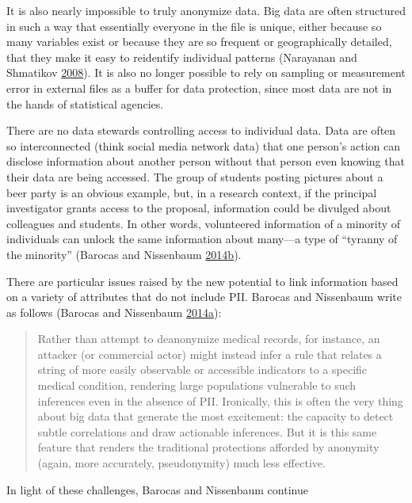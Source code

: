 \documentclass[]{krantz}
\begin{document}
It is also nearly impossible to truly anonymize data. Big data are often
structured in such a way that essentially everyone in the file is
unique, either because so many variables exist or because they are so
frequent or geographically detailed, that they make it easy to
reidentify individual patterns (Narayanan and Shmatikov
\protect\hyperlink{ref-narayanan2008robust}{2008}). It is also no longer
possible to rely on sampling or measurement error in external files as a
buffer for data protection, since most data are not in the hands of
statistical agencies.

There are no data stewards controlling access to individual data. Data
are often so interconnected (think social media network data) that one
person's action can disclose information about another person without
that person even knowing that their data are being accessed. The group
of students posting pictures about a beer party is an obvious example,
but, in a research context, if the principal investigator grants access
to the proposal, information could be divulged about colleagues and
students. In other words, volunteered information of a minority of
individuals can unlock the same information about many---a type of
``tyranny of the minority'' (Barocas and Nissenbaum
\protect\hyperlink{ref-barocas2014bigger}{2014}\protect\hyperlink{ref-barocas2014bigger}{b}).

There are particular issues raised by the new potential to link
information based on a variety of attributes that do not include PII.
Barocas and Nissenbaum write as follows (Barocas and Nissenbaum
\protect\hyperlink{ref-barocas2014big}{2014}\protect\hyperlink{ref-barocas2014big}{a}):

\begin{quote}
Rather than attempt to deanonymize medical records, for instance, an
attacker (or commercial actor) might instead infer a rule that relates a
string of more easily observable or accessible indicators to a specific
medical condition, rendering large populations vulnerable to such
inferences even in the absence of PII. Ironically, this is often the
very thing about big data that generate the most excitement: the
capacity to detect subtle correlations and draw actionable inferences.
But it is this same feature that renders the traditional protections
afforded by anonymity (again, more accurately, pseudonymity) much less
effective.
\end{quote}

In light of these challenges, Barocas and Nissenbaum continue
\end{document}
